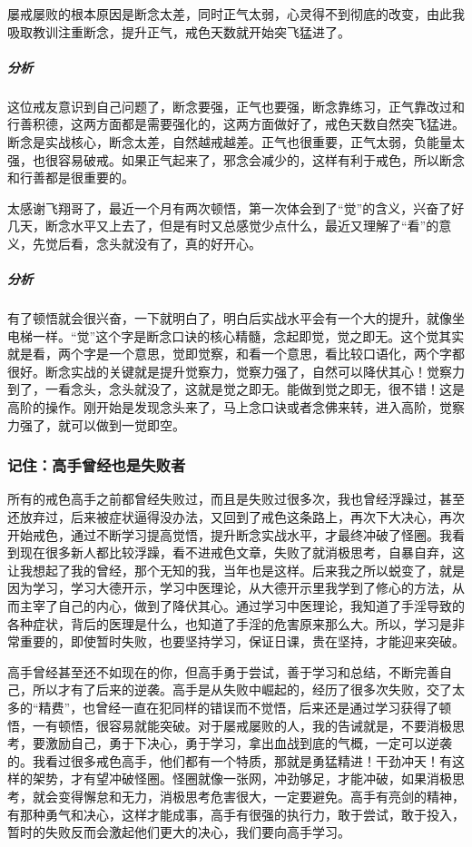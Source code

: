 \begin{case}
    屡戒屡败的根本原因是断念太差，同时正气太弱，心灵得不到彻底的改变，由此我吸取教训注重断念，提升正气，戒色天数就开始突飞猛进了。
    \subparagraph{分析} 这位戒友意识到自己问题了，断念要强，正气也要强，断念靠练习，正气靠改过和行善积德，这两方面都是需要强化的，这两方面做好了，戒色天数自然突飞猛进。断念是实战核心，断念太差，自然越戒越差。正气也很重要，正气太弱，负能量太强，也很容易破戒。如果正气起来了，邪念会减少的，这样有利于戒色，所以断念和行善都是很重要的。
\end{case}

\begin{case}
    太感谢飞翔哥了，最近一个月有两次顿悟，第一次体会到了“觉”的含义，兴奋了好几天，断念水平又上去了，但是有时又总感觉少点什么，最近又理解了“看”的意义，先觉后看，念头就没有了，真的好开心。
    \subparagraph{分析} 有了顿悟就会很兴奋，一下就明白了，明白后实战水平会有一个大的提升，就像坐电梯一样。“觉”这个字是断念口诀的核心精髓，念起即觉，觉之即无。这个觉其实就是看，两个字是一个意思，觉即觉察，和看一个意思，看比较口语化，两个字都很好。断念实战的关键就是提升觉察力，觉察力强了，自然可以降伏其心！觉察力到了，一看念头，念头就没了，这就是觉之即无。能做到觉之即无，很不错！这是高阶的操作。刚开始是发现念头来了，马上念口诀或者念佛来转，进入高阶，觉察力强了，就可以做到一觉即空。
\end{case}

\subsubsection{记住：高手曾经也是失败者}

所有的戒色高手之前都曾经失败过，而且是失败过很多次，我也曾经浮躁过，甚至还放弃过，后来被症状逼得没办法，又回到了戒色这条路上，再次下大决心，再次开始戒色，通过不断学习提高觉悟，提升断念实战水平，才最终冲破了怪圈。我看到现在很多新人都比较浮躁，看不进戒色文章，失败了就消极思考，自暴自弃，这让我想起了我的曾经，那个无知的我，当年也是这样。后来我之所以蜕变了，就是因为学习，学习大德开示，学习中医理论，从大德开示里我学到了修心的方法，从而主宰了自己的内心，做到了降伏其心。通过学习中医理论，我知道了手淫导致的各种症状，背后的医理是什么，也知道了手淫的危害原来那么大。所以，学习是非常重要的，即使暂时失败，也要坚持学习，保证日课，贵在坚持，才能迎来突破。

高手曾经甚至还不如现在的你，但高手勇于尝试，善于学习和总结，不断完善自己，所以才有了后来的逆袭。高手是从失败中崛起的，经历了很多次失败，交了太多的“精费”，也曾经一直在犯同样的错误而不觉悟，后来还是通过学习获得了顿悟，一有顿悟，很容易就能突破。对于屡戒屡败的人，我的告诫就是，不要消极思考，要激励自己，勇于下决心，勇于学习，拿出血战到底的气概，一定可以逆袭的。我看过很多戒色高手，他们都有一个特质，那就是勇猛精进！干劲冲天！有这样的架势，才有望冲破怪圈。怪圈就像一张网，冲劲够足，才能冲破，如果消极思考，就会变得懈怠和无力，消极思考危害很大，一定要避免。高手有亮剑的精神，有那种勇气和决心，这样才能成事，高手有很强的执行力，敢于尝试，敢于投入，暂时的失败反而会激起他们更大的决心，我们要向高手学习。

